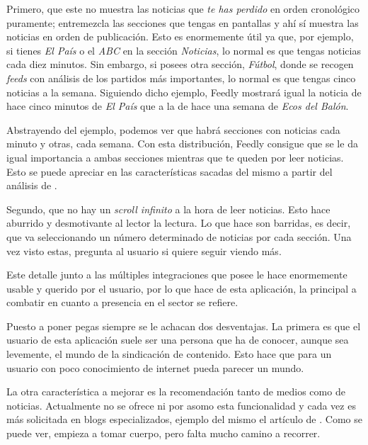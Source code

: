Primero, que este no muestra las noticias que \textit{te has perdido} en orden cronológico puramente; entremezcla las secciones que tengas en pantallas y ahí sí muestra las noticias en orden de publicación. Esto es enormemente útil ya que, por ejemplo, si tienes \textit{El País} o el \textit{ABC} en la sección \textit{Noticias}, lo normal es que tengas noticias cada diez minutos. Sin embargo, si posees otra sección, \textit{Fútbol}, donde se recogen \textit{feeds} con análisis de los partidos más importantes, lo normal es que tengas cinco noticias a la semana. Siguiendo dicho ejemplo, Feedly mostrará igual la noticia de hace cinco minutos de \textit{El País} que a la de hace una semana de \textit{Ecos del Balón}.

Abstrayendo del ejemplo, podemos ver que habrá secciones con noticias cada minuto y otras, cada semana. Con esta distribución, Feedly consigue que se le da igual importancia a ambas secciones mientras que te queden por leer noticias. Esto se puede apreciar en las características sacadas del mismo a partir del análisis de .


Segundo, que no hay un \textit{scroll infinito} a la hora de leer noticias. Esto hace aburrido y desmotivante al lector la lectura. Lo que hace son barridas, es decir, que va seleccionando un número determinado de noticias por cada sección. Una vez visto estas, pregunta al usuario si quiere seguir viendo más.

Este detalle junto a las múltiples integraciones que posee le hace enormemente usable y querido por el usuario, por lo que hace de esta aplicación, la principal a combatir en cuanto a presencia en el sector se refiere.

Puesto a poner pegas siempre se le achacan dos desventajas. La primera es que el usuario de esta aplicación suele ser una persona que ha de conocer, aunque sea levemente, el mundo de la sindicación de contenido. Esto hace que para un usuario con poco conocimiento de internet pueda parecer un mundo.

La otra característica a mejorar es la recomendación tanto de medios como de noticias. Actualmente no se ofrece ni por asomo esta funcionalidad y cada vez es más solicitada en blogs especializados, ejemplo del mismo el artículo de . Como se puede ver, empieza a tomar cuerpo, pero falta mucho camino a recorrer.

